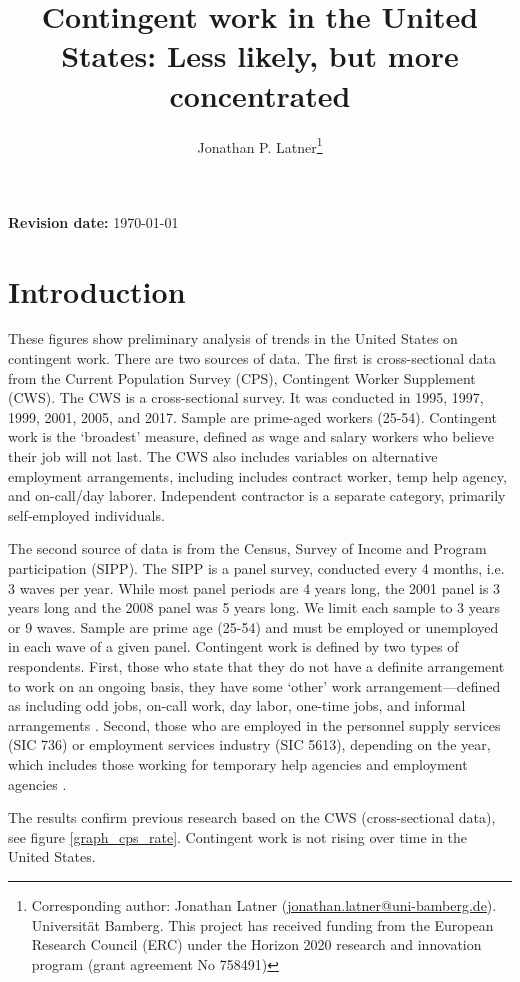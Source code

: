 \documentclass[12pt]{article}
\title{Contingent work in the United States: Less likely, but more concentrated}
\author{Jonathan P. Latner\thanks{Corresponding author: Jonathan Latner (\url{jonathan.latner@uni-bamberg.de}).  Universit{\"a}t Bamberg.  This project has received funding from the European Research Council (ERC) under the Horizon 2020 research and innovation program (grant agreement No 758491)}}
\date{\vspace{-5ex}}
\begin{document}
\maketitle

{\bf Revision date:} \today

\section{Introduction}

These figures show preliminary analysis of trends in the United States on contingent work.  There are two sources of data.  The first is cross-sectional data from the Current Population Survey (CPS), Contingent Worker Supplement (CWS).  The CWS is a cross-sectional survey.  It was conducted in 1995, 1997, 1999, 2001, 2005, and 2017.  Sample are prime-aged workers (25-54).  Contingent work is the `broadest' measure, defined as wage and salary workers who believe their job will not last.  The CWS also includes variables on alternative employment arrangements, including includes contract worker, temp help agency, and on-call/day laborer.  Independent contractor is a separate category, primarily self-employed individuals.  

The second source of data is from the Census, Survey of Income and Program participation (SIPP).  The SIPP is a panel survey, conducted every 4 months, i.e. 3 waves per year.  While most panel periods are 4 years long, the 2001 panel is 3 years long and the 2008 panel was 5 years long.  We limit each sample to 3 years or 9 waves.  Sample are prime age (25-54) and must be employed or unemployed in each wave of a given panel.  Contingent work is defined by two types of respondents.  First, those who state that they do not have a definite arrangement to work on an ongoing basis, they have some `other' work arrangement—defined as including odd jobs, on-call work, day labor, one-time jobs, and informal arrangements \citep{gao_2015}.  Second, those who are employed in the personnel supply services (SIC 736) or employment services industry (SIC 5613), depending on the year, which includes those working for temporary help agencies and employment agencies \citep{lane_etal_2003}.

The results confirm previous research based on the CWS (cross-sectional data), see figure \ref{graph_cps_rate}.  Contingent work is not rising over time in the United States.  
\end{document}
